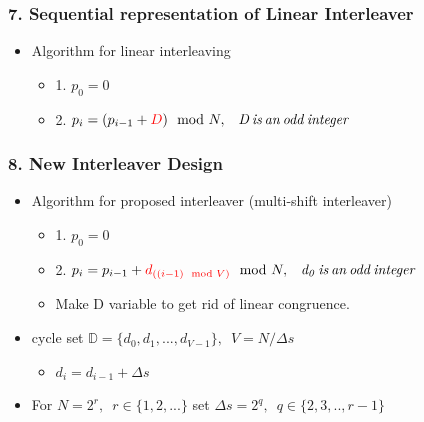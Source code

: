 \documentclass{beamer}  %
\begin{document}
\begin{frame}
\frametitle{7. Sequential representation of Linear Interleaver}

\begin{itemize}
\setlength\itemsep{2em}



 \item Algorithm for linear interleaving



\begin{itemize}
\setlength\itemsep{1.5em}
\item 1. $p_0=0$
 
\item 2. $p_i=(p_{i-1}+\textcolor{red}{D}) \mod N,\,\,\,\,\,  \mathit{D \,is \,an \,odd \,integer}$ 

\end{itemize}




\end{itemize}


\end{frame}
\begin{frame}
\frametitle{8. New Interleaver Design}

\begin{itemize}
\setlength\itemsep{1.5em}

\item Algorithm for proposed interleaver (multi-shift interleaver)

\begin{itemize}
\item 1. $p_0=0$
 
 \item 2. $p_i=p_{i-1}+\textcolor{red}{d_{((i-1) \mod V) } }\mod N,\,\,\,\,\,  \mathit{d_0 \,is \,an \,odd \,integer}$

\item Make D variable to get rid of linear congruence.
\end{itemize}

\item cycle set $\mathbb{D}=\{d_0,d_1,...,d_{V-1}\},\,\,\, V=N/\Delta s$
\begin{itemize}
\item $d_i=d_{i-1}+\Delta s$
\end{itemize}

\item For $N=2^r,\,\,\, r\in \{ 1,2,...\}$ set $\Delta s= 2^q, \,\,\, q\in\{2,3,..,r-1\}$







\end{itemize}


\end{frame}
\end{document}
